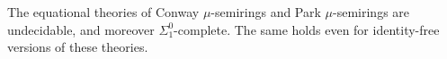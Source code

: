 \documentclass[runningheads]{amsart}
\begin{document}
\begin{corollary}
    The equational theories of Conway $\mu$-semirings and Park $\mu$-semirings are undecidable, and moreover $\Sigma^0_1$-complete.
    The same holds even for identity-free versions of these theories.
\end{corollary}








\end{document}
